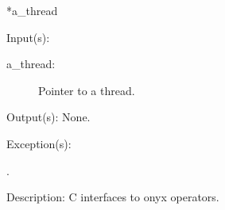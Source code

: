 \begin{capi}
{{*a\_thread}}
\label{systemdict_yield}
	\begin{capilist}
	\item[Input(s): ]
		\begin{description}\item[]
		\item[a\_thread: ]
			Pointer to a thread.
		\end{description}
	\item[Output(s): ] None.
	\item[Exception(s): ]
		\begin{description}\item[]
		\item[.]
		\end{description}
	\item[Description: ]
		C interfaces to onyx operators.
	\end{capilist}
\end{capi}

